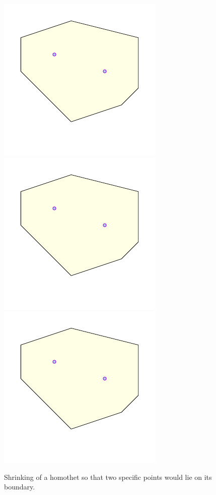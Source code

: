 \begin{figure}[h]
    \includegraphics[page=1]{../figs/shrink_2}%
    \hfill%
    \includegraphics[page=2]{../figs/shrink_2}%
    \hfill%
    \includegraphics[page=3]{../figs/shrink_2}
    \caption{Shrinking of a homothet so that two specific points would lie on its boundary.}
\end{figure}





